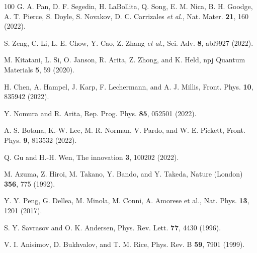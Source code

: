 \documentclass[prl,twocolumn,preprintnumbers,superscriptaddress]{revtex4-1}
\begin{document}
\begin{thebibliography}{100}
G. A. Pan, D. F. Segedin, H. LaBollita, Q. Song, E. M. Nica, B. H. Goodge, A. T. Pierce, S. Doyle, S. Novakov, D. C. Carrizales \emph{et al.}, Nat. Mater. \textbf{21}, 160 (2022).

S. Zeng, C. Li, L. E. Chow, Y. Cao, Z. Zhang \emph{et al.}, Sci. Adv. \textbf{8}, 
abl9927 (2022).

M. Kitatani, L. Si, O. Janson, R. Arita, Z. Zhong, and K. Held, npj Quantum Materials \textbf{5}, 59 (2020).

H. Chen, A. Hampel, J. Karp, F. Lechermann, and A. J. Millis, Front. Phys. \textbf{10}, 835942 (2022).

Y. Nomura and R. Arita, Rep. Prog. Phys. \textbf{85}, 052501 (2022).

A. S. Botana, K.-W. Lee, M. R. Norman, V. Pardo, and W. E. Pickett,
Front. Phys. \textbf{9}, 813532 (2022).

Q. Gu and H.-H. Wen, The innovation \textbf{3}, 100202 (2022).



M. Azuma, Z. Hiroi, M. Takano, Y. Bando, and Y. Takeda, Nature (London) \textbf{356}, 775 (1992).

Y. Y. Peng, G. Dellea, M. Minola, M. Conni, A. Amorese et al., Nat. Phys. \textbf{13}, 1201 (2017).

S. Y. Savrasov and O. K. Andersen, Phys. Rev. Lett. \textbf{77}, 4430 (1996).


V. I. Anisimov, D. Bukhvalov, and T. M. Rice, Phys. Rev. B \textbf{59}, 7901 (1999).


\end{thebibliography}
\end{document}
